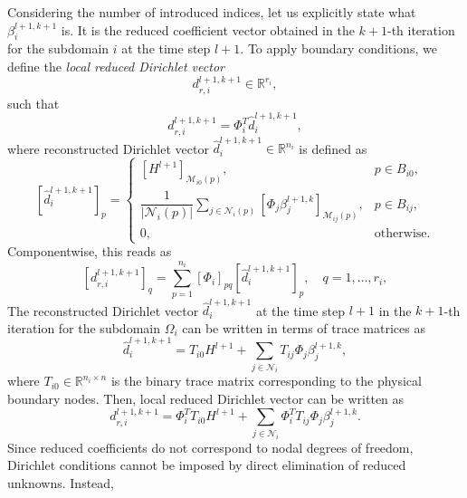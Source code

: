 \documentclass[a4paper, 11pt]{article}
\theoremstyle{plain}
\theoremstyle{definition}
\theoremstyle{remark}
\begin{document}
Considering the number of introduced indices, let us explicitly state what $\beta_{i}^{l+1, k+1}$ is. It is the 
reduced coefficient vector obtained in the $k+1$-th iteration for the subdomain $i$ at the time step $l+1$. 
To apply boundary conditions, we define the \textit{local reduced Dirichlet vector} 
\begin{equation*}
    d^{l+1, k+1}_{r, i} \in \mathbb{R}^{r_{i}},
\end{equation*}
such that
\begin{equation*}
    d^{l+1, k+1}_{r, i} = \Phi_{i}^{T}\hat{d}^{l+1, k+1}_{i},
\end{equation*}
where reconstructed Dirichlet vector $\hat{d}^{l+1, k+1}_{i}\in \mathbb{R}^{n_{i}}$ is defined as
\begin{equation*}
    \left[\hat{d}^{l+1, k+1}_{i}\right]_{p} = 
    \begin{cases}
        \left[H^{l+1}\right]_{\mathcal{M}_{i0}(p)}, & p\in B_{i0},\\[3pt]
        \dfrac{1}{\lvert \mathcal{N}_{i}(p)\rvert}\sum\limits_{j\in\mathcal{N}_{i}(p)}\left[\Phi_{j}\beta^{l+1, k}_{j}\right]_{\mathcal{M}_{ij}(p)}, & p\in B_{ij},\\
        0, & \text{otherwise}.
    \end{cases}
\end{equation*}
Componentwise, this reads as
\begin{equation*}
    \left[d^{l+1, k+1}_{r, i}\right]_{q} = \sum_{p = 1}^{n_{i}}\left[\Phi_{i}\right]_{pq}\left[\hat{d}^{l+1, k+1}_{i}\right]_{p}, \quad q = 1, \ldots, r_{i},
\end{equation*}
The reconstructed Dirichlet vector $\hat{d}^{l+1, k+1}_{i}$ at the time step $l+1$ in the $k+1$-th iteration for the subdomain $\Omega_i$ can be written in terms of trace matrices as
\begin{equation*}
    \hat{d}^{l+1, k+1}_{i} = T_{i0}H^{l+1} + \sum_{j\in\mathcal{N}_{i}}T_{ij}\Phi_{j}\beta^{l+1, k}_{j},
\end{equation*}
where $T_{i0}\in \mathbb{R}^{n_{i}\times n}$ is the binary trace matrix 
corresponding to the physical boundary nodes. Then, local reduced Dirichlet vector can be written as
\begin{equation*}
    d^{l+1, k+1}_{r, i} = \Phi_{i}^{T}T_{i0}H^{l+1} + \sum_{j\in\mathcal{N}_{i}}\Phi_{i}^{T}T_{ij}\Phi_{j}\beta^{l+1, k}_{j}.
\end{equation*}
Since reduced coefficients do not correspond to nodal degrees of freedom, Dirichlet 
conditions cannot be imposed by direct elimination of reduced unknowns. Instead, 
\end{document}
